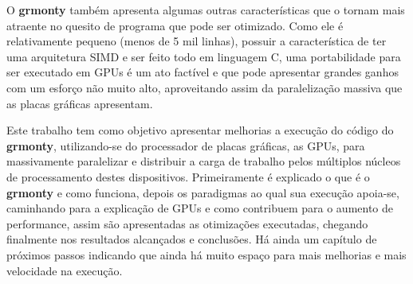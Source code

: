 O \textbf{grmonty} também apresenta algumas outras características que o tornam mais atraente no quesito de programa que pode ser otimizado. Como ele é relativamente pequeno (menos de 5 mil linhas), possuir a característica de ter uma arquitetura SIMD e ser feito todo em linguagem C, uma portabilidade para ser executado em GPUs é um ato factível e que pode apresentar grandes ganhos com um esforço não muito alto, aproveitando assim da paralelização massiva que as placas gráficas apresentam.

Este trabalho tem como objetivo apresentar melhorias a execução do código do \textbf{grmonty}, utilizando-se do processador de placas gráficas, as GPUs, para massivamente paralelizar e distribuir a carga de trabalho pelos múltiplos núcleos de processamento destes dispositivos. Primeiramente é explicado o que é o \textbf{grmonty} e como funciona, depois os paradigmas ao qual sua execução apoia-se, caminhando para a explicação de GPUs e como contribuem para o aumento de performance, assim são apresentadas as otimizações executadas, chegando finalmente nos resultados alcançados e conclusões. Há ainda um capítulo de próximos passos indicando que ainda há muito espaço para mais melhorias e mais velocidade na execução.

%
%
%
%
%
%
%
%
